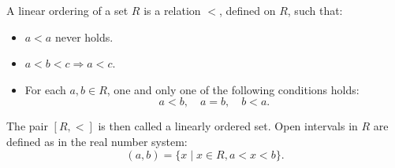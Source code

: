 A linear ordering of a set $R$ is a relation $<$, defined on $R$, such that:
\begin{itemize}
\item[(O.1)] $a < a$ never holds.
\item[(O.2)] $a < b < c \Rightarrow a < c$.
\item[(O.3)] For each $a, b \in R$, one and only one of the following conditions holds:
$$a < b, \quad a = b, \quad b < a.$$
\end{itemize}
The pair $[R, <]$ is then called a linearly ordered set. Open intervals in $R$ are defined as in the real number system:
$$(a, b) = \{x \mid x \in R, a < x < b\}.$$
